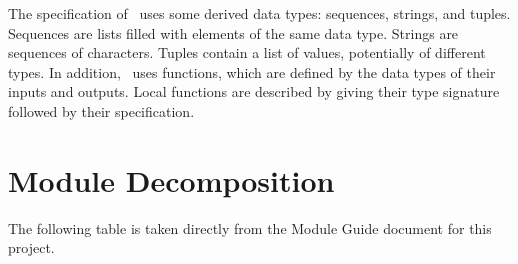 \documentclass[12pt, titlepage]{article}
\begin{document}
\noindent
The specification of \progname \ uses some derived data types: sequences, strings, and
tuples. Sequences are lists filled with elements of the same data type. Strings
are sequences of characters. Tuples contain a list of values, potentially of
different types. In addition, \progname \ uses functions, which
are defined by the data types of their inputs and outputs. Local functions are
described by giving their type signature followed by their specification.

\section{Module Decomposition}

The following table is taken directly from the Module Guide document for this project.
\end{document}
